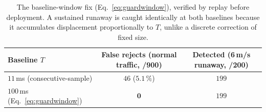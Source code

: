 \begin{table}[htbp]
\centering\small
\begin{tabular}{lcc}
\toprule
Baseline $T$ & False rejects (normal traffic, /900) & Detected (6\,m/s runaway, /200) \\
\midrule
$11$\,ms (consecutive-sample) & $46$ ($5.1\,\%$) & $199$ \\
$100$\,ms (Eq.~\ref{eq:guardwindow}) & $\mathbf{0}$ & $199$ \\
\bottomrule
\end{tabular}
\caption{The baseline-window fix (Eq.~\ref{eq:guardwindow}), verified by
replay before deployment. A sustained runaway is caught identically at both
baselines because it accumulates displacement proportionally to $T$, unlike
a discrete correction of fixed size.}
\label{tab:guardwindow}
\end{table}

